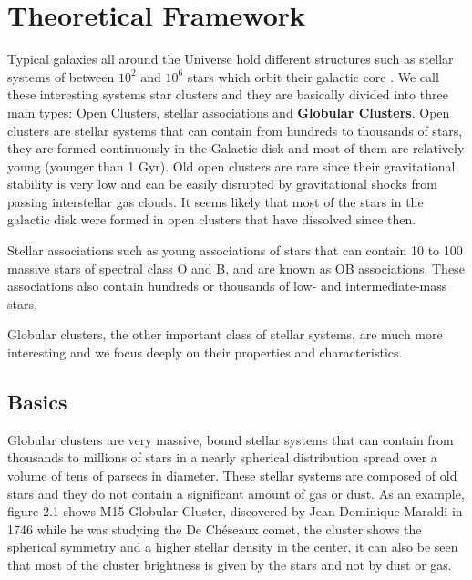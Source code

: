 \chapter{Theoretical Framework}

Typical galaxies all around the Universe hold different structures such as stellar systems of between $ 10^{2} $ and $ 10^{6} $ stars which orbit their galactic core . We call these interesting systems star clusters and they are basically divided into three main types: Open Clusters, stellar associations and \textbf{Globular Clusters}. Open clusters are stellar systems that can contain from hundreds to thousands of stars, they are formed continuously in the Galactic disk and most of them are relatively young (younger than 1 Gyr). Old open clusters are rare since their gravitational stability is very low and can be easily disrupted by gravitational shocks from passing interstellar gas clouds. It seems likely that most of the stars in the galactic disk were formed in open clusters that have dissolved since then. 

Stellar associations such as young associations of stars that can contain 10 to 100 massive stars of spectral class O and B, and are known as OB associations. These associations also contain hundreds or thousands of low- and intermediate-mass stars.

Globular clusters, the other important class of stellar systems, are much more interesting and we focus deeply on their properties and characteristics.  

\section{Basics}
 
Globular clusters are very massive, bound stellar systems that can contain from thousands to millions of stars in a nearly spherical distribution spread over a volume of tens of parsecs in diameter. These stellar systems are composed of old stars and they do not contain a significant amount of gas or dust. As an example, figure 2.1 shows M15 Globular Cluster, discovered by Jean-Dominique Maraldi in 1746 while he was studying the De Chéseaux comet, the cluster shows the spherical symmetry and a higher stellar density in the center, it can also be seen that most of the cluster brightness is given by the stars and not by dust or gas.

